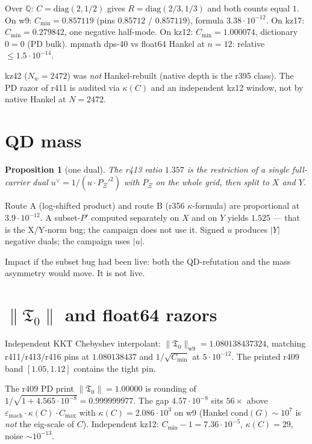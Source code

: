 \documentclass[11pt]{article}
\newtheorem{prop}{Proposition}
\theoremstyle{remark}
\newcommand{\Cmin}{C_{\min}}
\newcommand{\Tnull}{\mathfrak{T}_0}
\begin{document}
Over $\mathbb{Q}$: $C=\mathrm{diag}(2,1/2)$
gives $R=\mathrm{diag}(2/3,1/3)$ and both
counts equal $1$.
On w9: $\Cmin=0.857119$ (pins $0.85712$ /
$0.857119$), formula $3.38\cdot10^{-12}$.
On kz17: $\Cmin=0.279842$, one negative
half-mode.
On kz12: $\Cmin=1.000074$, dictionary
$0=0$ (PD bulk).
mpmath dps-$40$ vs float64 Hankel at
$n=12$: relative $\le 1.5\cdot10^{-14}$.

kz42 ($N_w=2472$) was \emph{not}
Hankel-rebuilt (native depth is the r395
class).  The PD razor of r411 is audited
via $\kappa(C)$ and an independent kz12
window, not by native Hankel at $N=2472$.

\section{QD mass}\label{sec:T2}

\begin{prop}[one dual]\label{prop:qd}
The r413 ratio $1.357$ is the restriction
of a \emph{single} full-carrier dual
$u^\vee=1/(u\cdot P_\Xi'^2)$ with $P_\Xi$
on the whole grid, then split to $X$ and $Y$.
\end{prop}

Route A (log-shifted product) and route B
(r356 $\kappa$-formula) are proportional at
$3.9\cdot10^{-12}$.
A subset-$P'$ computed separately on $X$
and on $Y$ yields $1.525$ --- that is the
X/Y-norm bug; the campaign does not use it.
Signed $u$ produces $|Y|$ negative duals;
the campaign uses $|u|$.

Impact if the subset bug had been live:
both the QD-refutation and the mass
asymmetry would move.  It is not live.

\section{$\|\Tnull\|$ and float64 razors}\label{sec:T3}

Independent KKT Chebyshev interpolant:
$\|\Tnull\|_{\mathrm{w9}}=1.080138437324$,
matching r411/r413/r416 pins at
$1.080138437$ and $1/\sqrt{\Cmin}$ at
$5\cdot10^{-12}$.
The printed r409 band $[1.05,1.12]$
contains the tight pin.

The r409 PD print $\|\Tnull\|=1.00000$ is
rounding of
$1/\sqrt{1+4.565\cdot10^{-8}}=0.999999977$.
The gap $4.57\cdot10^{-8}$ sits
$56\times$ above
$\varepsilon_{\mathrm{mach}}\cdot\kappa(C)\cdot C_{\max}$
with $\kappa(C)=2.086\cdot10^3$ on w9
(Hankel $\mathrm{cond}(G)\sim10^7$ is
\emph{not} the eig-scale of $C$).
Independent kz12: $\Cmin-1=7.36\cdot10^{-5}$,
$\kappa(C)=29$, noise $\sim10^{-13}$.
\end{document}
